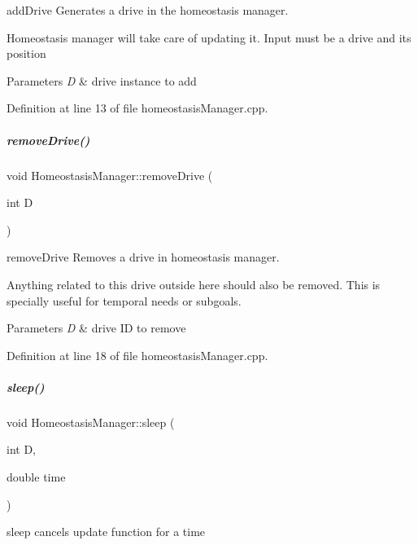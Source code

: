 add\+Drive Generates a drive in the homeostasis manager. 

Homeostasis manager will take care of updating it. Input must be a drive and its position 
\begin{DoxyParams}{Parameters}
{\em D} & drive instance to add \\
\hline
\end{DoxyParams}


Definition at line 13 of file homeostasis\+Manager.\+cpp.

\mbox{\label{group__homeostasis_a47f7063f612ac4a4a1cbf96bf289fa56}} 
\subparagraph{\texorpdfstring{remove\+Drive()}{removeDrive()}}
{\footnotesize\ttfamily void Homeostasis\+Manager\+::remove\+Drive (\begin{DoxyParamCaption}\item[{int}]{D }\end{DoxyParamCaption})}



remove\+Drive Removes a drive in homeostasis manager. 

Anything related to this drive outside here should also be removed. This is specially useful for temporal needs or subgoals. 
\begin{DoxyParams}{Parameters}
{\em D} & drive ID to remove \\
\hline
\end{DoxyParams}


Definition at line 18 of file homeostasis\+Manager.\+cpp.

\mbox{\label{group__homeostasis_a334738e699f022c7d364a01fa8b77231}} 
\subparagraph{\texorpdfstring{sleep()}{sleep()}}
{\footnotesize\ttfamily void Homeostasis\+Manager\+::sleep (\begin{DoxyParamCaption}\item[{int}]{D,  }\item[{double}]{time }\end{DoxyParamCaption})}



sleep cancels update function for a time 


